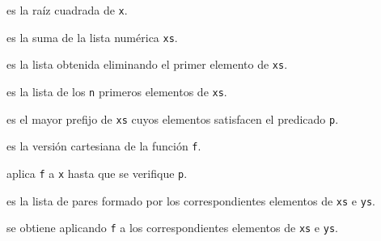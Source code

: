 \begin{enumerate*}
\item {} es la raíz cuadrada de \verb|x|.
\item {} es la suma de la lista numérica \verb|xs|.
\item {} es la lista obtenida eliminando el primer elemento de
  \verb|xs|.
\item {} es la lista de los \verb|n| primeros elementos de
  \verb|xs|.
\item {} es el mayor prefijo de \verb|xs| cuyos elementos
  satisfacen el predicado \verb|p|.
\item {} es la versión cartesiana de la función \verb|f|.
\item {} aplica \verb|f| a \verb|x| hasta que se verifique
  \verb|p|.
\item {} es la lista de pares formado por los correspondientes
  elementos de \verb|xs| e \verb|ys|.
\item {} se obtiene aplicando \verb|f| a los
  correspondientes elementos de \verb|xs| e \verb|ys|.
\end{enumerate*}
